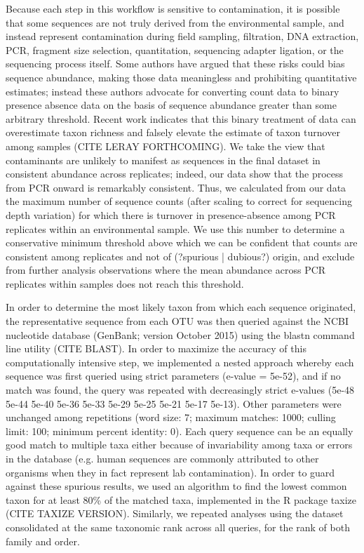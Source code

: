 \documentclass[11pt,letterpaper]{article} %
\begin{document}
Because each step in this workflow is sensitive to contamination, it is possible that some sequences are not truly derived from the environmental sample, and instead represent contamination during field sampling, filtration, DNA extraction, PCR, fragment size selection, quantitation, sequencing adapter ligation, or the sequencing process itself.
Some authors have argued that these risks could bias sequence abundance, making those data meaningless and prohibiting quantitative estimates; instead these authors advocate for converting count data to binary presence absence data on the basis of sequence abundance greater than some arbitrary threshold.
Recent work indicates that this binary treatment of data can overestimate taxon richness and falsely elevate the estimate of taxon turnover among samples (CITE LERAY FORTHCOMING).
We take the view that contaminants are unlikely to manifest as sequences in the final dataset in consistent abundance across replicates; indeed, our data show that the process from PCR onward is remarkably consistent.
Thus, we calculated from our data the maximum number of sequence counts (after scaling to correct for sequencing depth variation) for which there is turnover in presence-absence among PCR replicates within an environmental sample.
We use this number to determine a conservative minimum threshold above which we can be confident that counts are consistent among replicates and not of (?spurious | dubious?) origin, and exclude from further analysis observations where the mean abundance across PCR replicates within samples does not reach this threshold. %

In order to determine the most likely taxon from which each sequence originated, the representative sequence from each OTU was then queried against the NCBI nucleotide database (GenBank; version October 2015) using the blastn command line utility (CITE BLAST).
In order to maximize the accuracy of this computationally intensive step, we implemented a nested approach whereby each sequence was first queried using strict parameters (e-value = 5e-52), and if no match was found, the query was repeated with decreasingly strict e-values (5e-48 5e-44 5e-40 5e-36 5e-33 5e-29 5e-25 5e-21 5e-17 5e-13).
Other parameters were unchanged among repetitions (word size: 7; maximum matches: 1000; culling limit: 100; minimum percent identity: 0).
Each query sequence can be an equally good match to multiple taxa either because of invariability among taxa or errors in the database (e.g. human sequences are commonly attributed to other organisms when they in fact represent lab contamination).
In order to guard against these spurious results, we used an algorithm to find the lowest common taxon for at least 80\% of the matched taxa, implemented in the R package taxize (CITE TAXIZE VERSION).
Similarly, we repeated analyses using the dataset consolidated at the same taxonomic rank across all queries, for the rank of both family and order.
\end{document}
